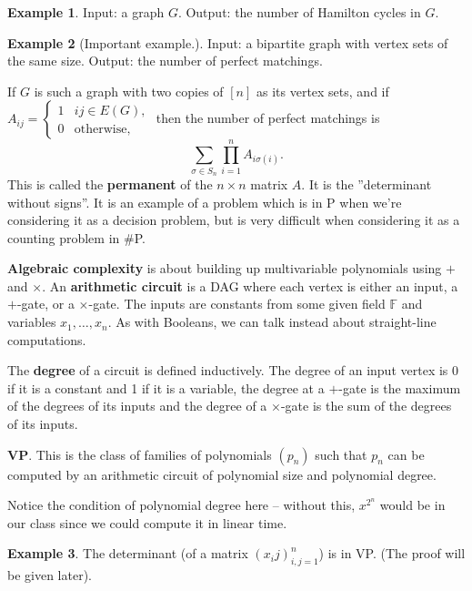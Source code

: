 \documentclass{article}
\theoremstyle{definition}
\newtheorem{example}{Example}[section]
\begin{document}
\begin{example}
    Input: a graph $G$. Output: the number of Hamilton cycles in $G$.
\end{example}
\begin{example}[Important example.]
    Input: a bipartite graph with vertex sets of the same size. Output: the number of perfect matchings.
    \vspace{1mm}
     
    If $G$ is such a graph with two copies of $[n]$ as its vertex sets, and if $A_{ij} = \begin{cases}
        1& ij \in E(G),\\
        0& \text{otherwise},
    \end{cases}$
    then the number of perfect matchings is \[
    \sum_{\sigma \in S_n}^{} \prod_{i=1}^{n} A_{i \sigma(i)}. 
    \]
    This is called the \textbf{permanent} of the $n \times n$ matrix $A$. It is the ''determinant without signs''. It is an example of a problem which is in P when we're considering it as a decision problem, but is very difficult when considering it as a counting problem in \#P.
\end{example}
\vspace{1mm}
 
\textbf{Algebraic complexity} is about building up multivariable polynomials using $+$ and $\times$. An \textbf{arithmetic circuit} is a DAG where each vertex is either an input, a $+$-gate, or a $\times$-gate. The inputs are constants from some given field $\mathbb{F}$ and variables $x_1,\ldots,x_n$. As with Booleans, we can talk instead about straight-line computations.
\vspace{1mm}

The \textbf{degree} of a circuit is defined inductively. The degree of an input vertex is 0 if it is a constant and 1 if it is a variable, the degree at a $+$-gate is the maximum of the degrees of its inputs and the degree of a $\times$-gate is the sum of the degrees of its inputs. 

\vspace{1mm}
 
\textbf{VP}. This is the class of families of polynomials $(p_n)$ such that $p_n$ can be computed by an arithmetic circuit of polynomial size and polynomial degree.
\vspace{1mm}
 
Notice the condition of polynomial degree here -- without this, $x^{2^n}$ would be in our class since we could compute it in linear time.
\begin{example}
    The determinant (of a matrix $(x_ij)_{i,j=1}^n$) is in VP. (The proof will be given later).
\end{example}
\vspace{1mm}
 
\end{document}
